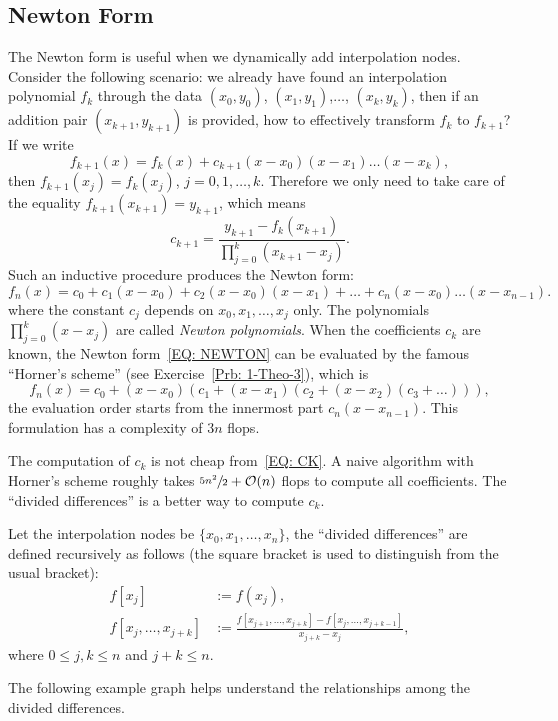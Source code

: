 \subsection{Newton Form}
The Newton form is useful when we dynamically add interpolation nodes. Consider the following scenario: we already have found an interpolation polynomial $f_k$ through the data $(x_0, y_0)$, $(x_1, y_1)$,$\dots$, $(x_k, y_k)$, then if an addition pair $(x_{k+1}, y_{k+1})$ is provided, how to effectively transform $f_k$ to $f_{k+1}$? If we write 
$$f_{k+1}(x) = f_k(x) + c_{k+1} (x - x_0)(x - x_1)\dots (x - x_{k}), $$
then $f_{k+1}(x_j) = f_k(x_j)$, $j = 0, 1,\dots, k$. Therefore we only need to take care of the equality $f_{k+1}(x_{k+1}) = y_{k+1}$, which means 
\begin{equation}\label{EQ: CK}
    c_{k+1} = \frac{y_{k+1} - f_k(x_{k+1})}{\prod_{j=0}^k (x_{k+1} - x_j)}.
\end{equation}
Such an inductive procedure produces the Newton form: 
\begin{equation}\label{EQ: NEWTON}
    f_n(x) = c_0 + c_1 ( x - x_0) + c_2 (x - x_0)(x - x_1)+\dots+c_{n}(x-x_0)\dots (x - x_{n-1}).
\end{equation}
where the constant $c_j$ depends on $x_0, x_1, \dots, x_{j}$ only. The polynomials $\prod_{j=0}^k (x - x_j)$ are called \emph{Newton polynomials}. When the coefficients $c_k$ are known, the Newton form~\eqref{EQ: NEWTON} can be evaluated by the famous ``Horner's scheme'' (see Exercise~\ref{Prb: 1-Theo-3}), which is
\begin{equation}\label{EQ: HORNER}
    f_n(x) = c_0 + (x-x_0)(c_1 + (x-x_1)(c_2 + (x-x_2)(c_3 + \dots))),
\end{equation}
the evaluation order starts from the innermost part $c_n (x -x_{n-1})$. This formulation has a complexity of $3n$ flops. 

\begin{remark}
    The computation of $c_k$ is not cheap from~\eqref{EQ: CK}. A naive algorithm with Horner's scheme roughly takes $\sfrac{5n^2}{2}+\mathcal O(n)$ flops to compute all coefficients. The ``divided differences'' is a better way to compute $c_k$.
\end{remark}
\begin{definition}
    Let the interpolation nodes be $\{x_0, x_1, \dots, x_n\}$, the ``{divided differences}'' are defined recursively as follows (the square bracket is used to distinguish from the usual bracket): 
    \begin{equation}
        \begin{aligned}
            f[x_j] &:= f(x_j),\\
        f[x_{j}, \dots, x_{j+k}] &:= \frac{f[x_{j+1},\dots, x_{j+k}] - f[x_j,\dots, x_{j+k-1}]}{x_{j+k} - x_{j}},
        \end{aligned}
    \end{equation}
    where $0\le j, k\le n$ and $j+k\le n$.
\end{definition}
The following example graph helps understand the relationships among the divided differences. 


